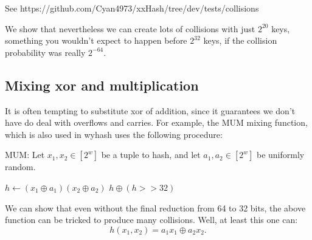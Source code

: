 See https://github.com/Cyan4973/xxHash/tree/dev/tests/collisions

We show that nevertheless we can create lots of collisions with just $2^{20}$ keys, something you wouldn't expect to happen before $2^{32}$ keys, if the collision probability was really $2^{-64}$.

\subsection{Mixing xor and multiplication}

It is often tempting to substitute xor of addition, since it guarantees we don't have do deal with overflows and carries.
For example, the MUM mixing function, which is also used in wyhash uses the following procedure:
\begin{algorithm}[H]
   \caption{
      MUM:
      Let $x_1,x_2\in [2^w]$ be a tuple to hash, and let $a_1,a_2\in[2^w]$ be uniformly random.
   }
   \begin{algorithmic}
      \State $h\gets (x_1 \oplus a_1)(x_2 \oplus a_2)$
      \State \Return $h \oplus (h >> 32)$
   \end{algorithmic}
\end{algorithm}
We can show that even without the final reduction from 64 to 32 bits, the above function can be tricked to produce many collisions.
Well, at least this one can:
\[
   h(x_1, x_2) = a_1 x_1 \oplus a_2 x_2.
\]

